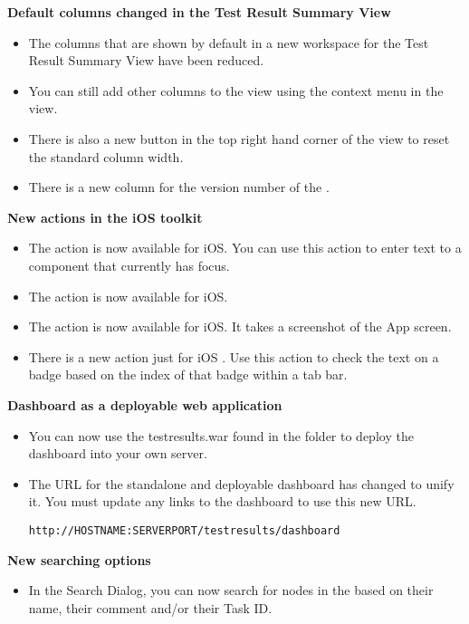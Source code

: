 \textbf{Default columns changed in the Test Result Summary View}
\begin{itemize}
\item The columns that are shown by default in a new workspace for the Test Result Summary View have been reduced.
\item You can still add other columns to the view using the context menu in the view.
\item There is also a new button in the top right hand corner of the view to reset the standard column width.
\item There is a new column for the version number of the \gdproject{}.
\end{itemize}

\textbf{New actions in the iOS toolkit}
\begin{itemize}
\item The action  is now available for iOS. You can use this action to enter text to a component that currently has focus.
\item The action  is now available for iOS.
\item The action  is now available for iOS. It takes a screenshot of the App screen.
\item There is a new action just for iOS . Use this action to check the text on a badge based on the index of that badge within a tab bar. 
\end{itemize}

\textbf{Dashboard as a deployable web application}
\begin{itemize}
\item You can now use the testresults.war found in the  folder to deploy the dashboard into your own server.
\item The URL for the standalone and deployable dashboard has changed to unify it. You must update any links to the dashboard to use this new URL.
\begin{verbatim}
http://HOSTNAME:SERVERPORT/testresults/dashboard
\end{verbatim}

\end{itemize}

\textbf{New searching options}
\begin{itemize}
\item In the Search Dialog, you can now search for nodes in the \gdproject{} based on their name, their comment and/or their Task ID.
\end{itemize}

